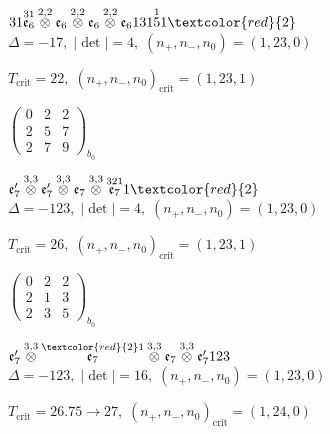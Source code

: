 \documentclass[10pt]{article}
\begin{document}
\smallskip

$31\overset{31}{\mathfrak{e}_6}\overset{2,2}{\otimes}\mathfrak{e}_6\overset{2,2}{\otimes}\mathfrak{e}_6\overset{2,2}{\otimes}\mathfrak{e}_6131\overset{1}{5}1\textcolor{red}{2}$ \quad $\Delta=-17,\; |\det|=4,\; (n_+,n_-,n_0)=(1,23,0)$

\hspace{1em}$T_{\text{crit}}=22,\; (n_+,n_-,n_0)_{\text{crit}}=(1,23,1)$

\hspace{2em}$\left(\begin{smallmatrix}0 & 2 & 2 \\ 2 & 5 & 7 \\ 2 & 7 & 9\end{smallmatrix}\right)_{\!b_0}$

\smallskip

$\mathfrak{e}_7'\overset{3,3}{\otimes}\mathfrak{e}_7'\overset{3,3}{\otimes}\mathfrak{e}_7\overset{3,3}{\otimes}\overset{321}{\mathfrak{e}_7}1\textcolor{red}{2}$ \quad $\Delta=-123,\; |\det|=4,\; (n_+,n_-,n_0)=(1,23,0)$

\hspace{1em}$T_{\text{crit}}=26,\; (n_+,n_-,n_0)_{\text{crit}}=(1,23,1)$

\hspace{2em}$\left(\begin{smallmatrix}0 & 2 & 2 \\ 2 & 1 & 3 \\ 2 & 3 & 5\end{smallmatrix}\right)_{\!b_0}$

\smallskip

$\mathfrak{e}_7'\overset{3,3}{\otimes}\overset{\textcolor{red}{2}1}{\mathfrak{e}_7}\overset{3,3}{\otimes}\mathfrak{e}_7\overset{3,3}{\otimes}\mathfrak{e}_7'123$ \quad $\Delta=-123,\; |\det|=16,\; (n_+,n_-,n_0)=(1,23,0)$

\hspace{1em}$T_{\text{crit}}=26.75 \to 27,\; (n_+,n_-,n_0)_{\text{crit}}=(1,24,0)$
\end{document}
